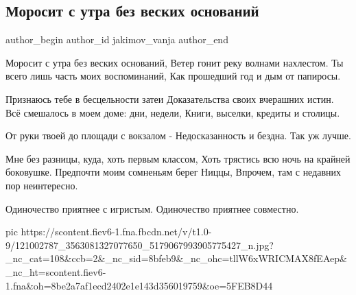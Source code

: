  
 
 
 
 
 
\subsection{Моросит с утра без веских оснований}
\label{sec:07_10_2020.fb.jakimov_vanja.1.morosit_s_utra}
\ifcmt
	author_begin
   author_id jakimov_vanja
	author_end
\fi

\begin{multicols}{2}
	\obeycr
	Моросит с утра без веских оснований,
Ветер гонит реку волнами нахлестом.
Ты всего лишь часть моих воспоминаний,
Как прошедший год и дым от папиросы.

Признаюсь тебе в бесцельности затеи
Доказательства своих вчерашних истин.
Всё смешалось в моем доме: дни, недели,
Книги, выселки, кредиты и столицы.

От руки твоей до площади с вокзалом - 
Недосказанность и бездна. 
Так уж лучше.

Мне без разницы, куда, хоть первым классом,
Хоть трястись всю ночь на крайней боковушке.
Предпочти моим сомненьям берег Ниццы,
Впрочем, там с недавних пор неинтересно.

Одиночество приятнее с игристым.
Одиночество приятнее совместно.
	\restorecr
\end{multicols}

\ifcmt
pic https://scontent.fiev6-1.fna.fbcdn.net/v/t1.0-9/121002787_3563081327077650_5179067993905775427_n.jpg?_nc_cat=108&ccb=2&_nc_sid=8bfeb9&_nc_ohc=tllW6xWRICMAX8fEAep&_nc_ht=scontent.fiev6-1.fna&oh=8be2a7af1ecd2402e1e143d356019759&oe=5FEB8D44
\fi

